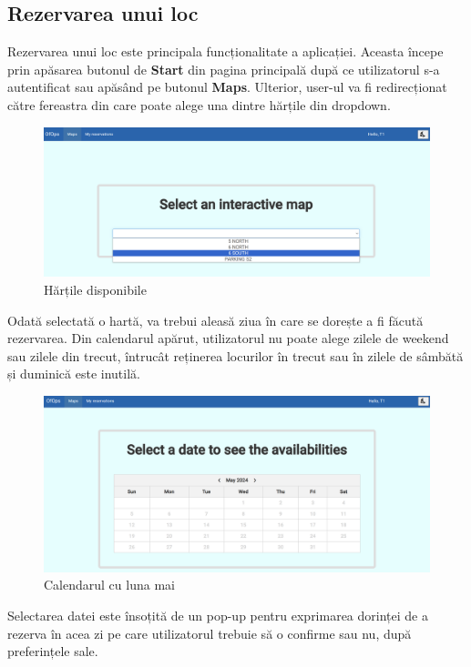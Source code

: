 \subsection{Rezervarea unui loc}

Rezervarea unui loc este principala funcționalitate a aplicației. Aceasta începe prin apăsarea butonul de \textbf{Start} din pagina principală după ce utilizatorul s-a autentificat sau apăsând pe butonul \textbf{Maps}. Ulterior, user-ul va fi redirecționat către fereastra din care poate alege una dintre hărțile din dropdown. 

\begin{figure}[!htb]
    \centering
    \includegraphics[width=0.9\linewidth]{images/harti.png}
    \caption{Hărțile disponibile}
    \label{fig:harti}
\end{figure}

Odată selectată o hartă, va trebui aleasă ziua în care se dorește a fi făcută rezervarea. Din calendarul apărut, utilizatorul nu poate alege zilele de weekend sau zilele din trecut, întrucât reținerea locurilor în trecut sau în zilele de sâmbătă și duminică este inutilă.  

\begin{figure}[!htb]
    \centering
    \includegraphics[width=0.9\linewidth]{images/calendar vechi.png}
    \caption{Calendarul cu luna mai}
    \label{fig:calendarvechi}
\end{figure}

Selectarea datei este însoțită de un pop-up pentru exprimarea dorinței de a rezerva în acea zi pe care utilizatorul trebuie să o confirme sau nu, după preferințele sale.

